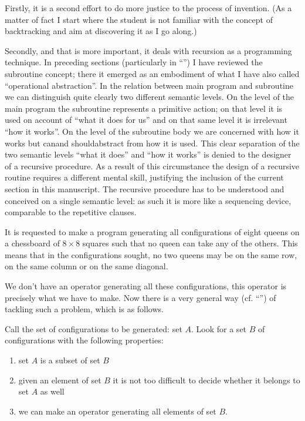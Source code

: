 \documentclass[twoside,11pt]{book}
\begin{document}
Firstly, it is a second effort to do more justice to the process of invention. (As a matter of fact I start where the student is not familiar with the concept of backtracking and aim at discovering it as I go along.)

Secondly, and that is more important, it deals with recursion as a programming technique. In preceding sections (particularly in ``'') I have reviewed the subroutine concept; there it emerged as an embodiment of what I have also called ``operational abstraction''. In the relation between main program and subroutine we can distinguish quite clearly two different semantic levels. On the level of the main program the subroutine represents a primitive action; on that level it is used on account of ``what it does for us'' and on that same level it is irrelevant ``how it works''. On the level of the subroutine body we are concerned with how it works but can\textemdash{}and should\textemdash{}abstract from how it is used. This clear separation of the two semantic levels ``what it does'' and ``how it works'' is denied to the designer of a recursive procedure. As a result of this circumstance the design of a recursive routine requires a different mental skill, justifying the inclusion of the current section in this manuscript. The recursive procedure has to be understood and conceived on a single semantic level: as such it is more like a sequencing device, comparable to the repetitive clauses.

It is requested to make a program generating all configurations of eight queens on a chessboard of $8\times 8$ squares such that no queen can take any of the others. This means that in the configurations sought, no two queens may be on the same row, on the same column or on the same diagonal.

We don't have an operator generating all these configurations, this operator is precisely what we have to make. Now there is a very general way (cf. ``'') of tackling such a problem, which is as follows.

Call the set of configurations to be generated: set $A$. Look for a set $B$ of configurations with the following properties:

\begin{enumerate}[wide, nosep, label=(\arabic*)]
	\item \label{en:first-item-eight-queen}
	set $A$ is a subset of set $B$
	
	\item \label{en:second-item-eight-queen}
	given an element of set $B$ it is not too difficult to decide whether it belongs to set $A$ as well
	
	\item \label{en:third-item-eight-queen}
	we can make an operator generating all elements of set $B$. 
\end{enumerate}
\end{document}
